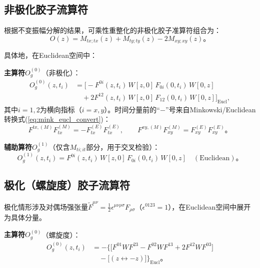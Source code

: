 \documentclass[12pt,a4paper]{ctexart}
\theoremstyle{definition}
\begin{document}
\subsection{非极化胶子流算符}

根据不变振幅分解的结果，可乘性重整化的非极化胶子准算符组合为\cite{Balitsky2020,NoteGluonPDFs,Chen2025gluon}：
\begin{equation}
O(z) = M_{tx;tx}(z) + M_{ty;ty}(z) - 2M_{xy;xy}(z)。
\label{eq:unpol_op_combo}
\end{equation}

具体地，在Euclidean空间中：\cite{NoteGluonPDFs}

\textbf{主算符$O^{(0)}_g$}（非极化）：
\begin{equation}
\begin{aligned}
O^{(0)}_g(z, t_i) &= \Big[ -F^{0i}(z,t_i)\,W[z,0]\,F_{0i}(0,t_i)\,W[0,z] \\
&\quad + 2F^{12}(z,t_i)\,W[z,0]\,F_{12}(0,t_i)\,W[0,z] \Big]_{\text{Eucl}},
\end{aligned}
\label{eq:Og0}
\end{equation}
其中$i=1,2$为横向指标（$i=x,y$）。时间分量前的``$-$''号来自Minkowski/Euclidean转换式(\ref{eq:mink_eucl_convert})：
\begin{equation}
F^{tx,(M)}F^{(M)}_{tx} = -F^{(E)}_{tx}F^{(E)}_{tx}, \qquad
F^{xy,(M)}F^{(M)}_{xy} = F^{(E)}_{xy}F^{(E)}_{xy}。
\end{equation}

\textbf{辅助算符$O^{(1)}_g$}（仅含$M_{ti;it}$部分，用于交叉检验）：
\begin{equation}
O^{(1)}_g(z, t_i) = F^{0i}(z,t_i)\,W[z,0]\,F_{0i}(0,t_i)\,W[0,z] \quad (\text{Euclidean})。
\label{eq:Og1}
\end{equation}

\subsection{极化（螺旋度）胶子流算符}

极化情形涉及对偶场强张量$\tilde{F}^{\mu\nu}=\frac{1}{2}\epsilon^{\mu\nu\rho\sigma}F_{\rho\sigma}$（$\epsilon^{0123}=1$），在Euclidean空间中展开为具体分量\cite{NoteGluonPDFs,Egerer2022}。

\textbf{主算符$O^{(0)}_g$}（螺旋度）：
\begin{equation}
\begin{aligned}
O^{(0)}_g(z, t_i) &= -\Big\{ \big[F^{01}W F^{23} - F^{02}W F^{13} + 2F^{12}W F^{03}\big] \\
&\quad - \big[ (z \leftrightarrow -z) \big] \Big\}_{\text{Eucl}}。
\end{aligned}
\label{eq:pol_Og0}
\end{equation}
\end{document}
